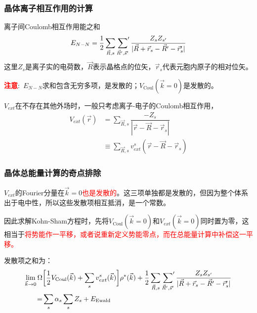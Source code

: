 \documentclass[cjk,slidestop,compress,mathserif,blue]{beamer}
\begin{document}
\frame
{
	\frametitle{晶体离子相互作用的计算}
	离子间\textrm{Coulomb}相互作用能之和
	\begin{displaymath}
		E_{N-N}=\dfrac12\sum_{\vec R,s}\sideset{}{^{\prime}}\sum_{\vec R^{\prime},\vec s^{\prime}}\dfrac{Z_sZ_{s^{\prime}}}{|\vec R+\vec r_s-\vec R^{\prime}-\vec r_s^{\prime}|}
	\end{displaymath}
	这里$Z_s$是离子实的电荷数，$\vec R$表示晶格点的位矢，$\vec r_s$代表元胞内原子的相对位矢。

	\textcolor{red}{\textbf{注意}}:~$E_{N-N}$求和包含无穷多项，是发散的；$V_{\mathrm{Coul}}(\vec k=0)$是发散的。
	
	$V_{ext}$在不存在其他外场时，一般只考虑离子-电子的\textrm{Coulomb}相互作用，
	\begin{displaymath}
		\begin{aligned}
			V_{ext}(\vec r)&=\sum_{\vec R,s}\dfrac{-Z_s}{|\vec r-\vec R-\vec r_s|}\\
			&\equiv\sum_{\vec R,s}v_{ext}^s(\vec r-\vec R-\vec r_s)
		\end{aligned}
	\end{displaymath}
}

\frame
{
	\frametitle{晶体总能量计算的奇点排除}
	$V_{ext}$的\textrm{Fourier}分量在$\vec k=0$\textcolor{red}{也是发散的}。这三项单独都是发散的，但因为整个体系出于电中性，所以这些发散项相互抵消，是一个常数。

	因此求解\textrm{Kohn-Sham}方程时，先将$V_{\mathrm{Coul}}(\vec k=0)$和$V_{ext}(\vec k=0)$同时置为零，这相当于\textcolor{red}{将势能作一平移，或者说重新定义势能零点，而在总能量计算中补偿这一平移。}

	发散项之和为：
	\begin{displaymath}
		\begin{aligned}
			\lim_{\vec k\rightarrow0}\Omega&\bigg[\dfrac12V_{\mathrm{Coul}}(\vec k)+\sum_sv_{ext}^s(\vec k)\bigg]\rho^{\ast}(\vec k)+\dfrac12\sum_{\vec R,s}\sideset{}{^{\prime}}\sum_{\vec R^{\prime},\vec s^{\prime}}\dfrac{Z_sZ_{s^{\prime}}}{|\vec R+\vec r_s-\vec R^{\prime}-\vec r_s^{\prime}|}\\
			=&\sum_s\alpha_s\sum_sZ_s+E_{\mathrm{Ewald}}
		\end{aligned}
	\end{displaymath}
}
\end{document}
